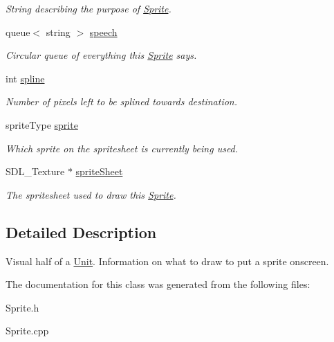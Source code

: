 \begin{DoxyCompactItemize}
\begin{DoxyCompactList}\small\item\em String describing the purpose of \hyperlink{class_sprite}{Sprite}. \end{DoxyCompactList}\item 
queue$<$ string $>$ \hyperlink{class_sprite_af7fbb50aaa8f3586b9a41def56384d43}{speech}\hypertarget{class_sprite_af7fbb50aaa8f3586b9a41def56384d43}{}\label{class_sprite_af7fbb50aaa8f3586b9a41def56384d43}

\begin{DoxyCompactList}\small\item\em Circular queue of everything this \hyperlink{class_sprite}{Sprite} says. \end{DoxyCompactList}\item 
int \hyperlink{class_sprite_aa3a18aaf97a12edfced1b31f2323ae01}{spline}\hypertarget{class_sprite_aa3a18aaf97a12edfced1b31f2323ae01}{}\label{class_sprite_aa3a18aaf97a12edfced1b31f2323ae01}

\begin{DoxyCompactList}\small\item\em Number of pixels left to be splined towards destination. \end{DoxyCompactList}\item 
sprite\+Type \hyperlink{class_sprite_afbd06de3c7cace1c741bbb609abfa119}{sprite}\hypertarget{class_sprite_afbd06de3c7cace1c741bbb609abfa119}{}\label{class_sprite_afbd06de3c7cace1c741bbb609abfa119}

\begin{DoxyCompactList}\small\item\em Which sprite on the spritesheet is currently being used. \end{DoxyCompactList}\item 
S\+D\+L\+\_\+\+Texture $\ast$ \hyperlink{class_sprite_aec7102885a3ca3fdd5124f8677135013}{sprite\+Sheet}\hypertarget{class_sprite_aec7102885a3ca3fdd5124f8677135013}{}\label{class_sprite_aec7102885a3ca3fdd5124f8677135013}

\begin{DoxyCompactList}\small\item\em The spritesheet used to draw this \hyperlink{class_sprite}{Sprite}. \end{DoxyCompactList}\end{DoxyCompactItemize}


\subsection{Detailed Description}
Visual half of a \hyperlink{class_unit}{Unit}. Information on what to draw to put a sprite onscreen. 

The documentation for this class was generated from the following files\+:\begin{DoxyCompactItemize}
\item 
Sprite.\+h\item 
Sprite.\+cpp\end{DoxyCompactItemize}
